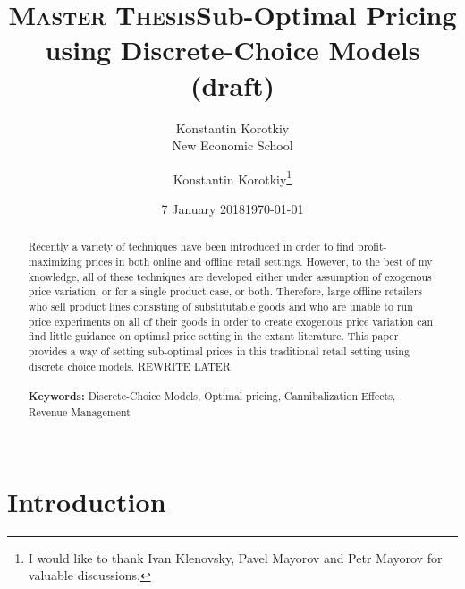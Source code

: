 \documentclass[12pt]{article}
\title{\textsc{Master Thesis}}
\author{Konstantin Korotkiy\\New Economic School}
\date{7 January 2018} %
\begin{document}
\newtheorem{theorem}{Theorem}
\newtheorem{proposition}{Proposition}
\newtheorem{definition}{Definition}
\newtheorem{example}{Example}
\newtheorem*{proof*}{Proof}
\newtheorem{corollary}{Corollary}
\newtheorem{lemma}{Lemma}
\newtheorem{as}{Assumption}
\newtheorem{lm}{Lemma}
\newtheorem{algorithm}{Algorithm}

\begin{titlepage}
\title{Sub-Optimal Pricing using Discrete-Choice Models (draft) }
\author{Konstantin Korotkiy\thanks{I would like to thank Ivan Klenovsky, Pavel Mayorov and Petr Mayorov for valuable discussions. }}

\date{\today}
\maketitle
\begin{abstract}
Recently a variety of techniques have been introduced in order to find profit-maximizing prices in both online and offline retail settings.
However, to the best of my knowledge, all of these techniques are developed either under assumption of exogenous price variation, or for a single product case, or both.
Therefore, large offline retailers who sell product lines consisting of substitutable goods and who are unable to run price experiments on all of their goods in order to create exogenous price variation can find little guidance on optimal price setting in the extant literature.
This paper provides a way of setting sub-optimal prices in this traditional retail setting using discrete choice models.
REWRITE LATER
\noindent  \\
\vspace{0in}\\
\noindent\textbf{Keywords:} Discrete-Choice Models, Optimal pricing, Cannibalization Effects, Revenue Management \\
\vspace{0in}\\


\bigskip
\end{abstract}
\setcounter{page}{0}
\thispagestyle{empty}
\end{titlepage}
\pagebreak \newpage

\newpage
\tableofcontents
\newpage


\section{Introduction}\label{sect1}
\end{document}
